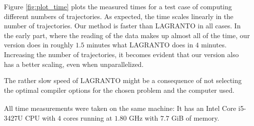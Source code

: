 Figure \ref{fig:plot_time} plots the measured times for a test case of computing different numbers of trajectories. As expected, the time scales linearly in the number of trajectories. Our method is faster than LAGRANTO in all cases. In the early part, where the reading of the data makes up almost all of the time, our version does in roughly $1.5$ minutes what LAGRANTO does in $4$ minutes. Increasing the number of trajectories, it becomes evident that our version also has a better scaling, even when unparallelized.

The rather slow speed of LAGRANTO might be a consequence of not selecting the optimal compiler options for the chosen problem and the computer used.

All time measurements were taken on the same machine: It has an Intel\textsuperscript{\textregistered} Core\textsuperscript{\texttrademark} i5-3427U CPU with $4$ cores running at $1.80$ GHz with $7.7$ GiB of memory.

